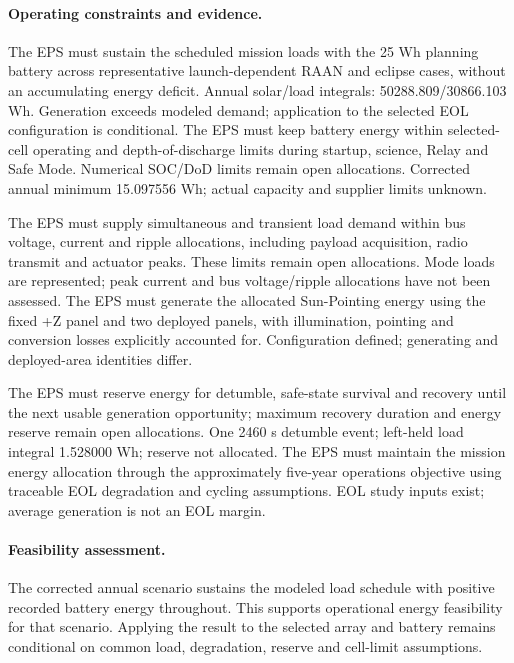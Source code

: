 \paragraph{Operating constraints and evidence.} 
The EPS must sustain the scheduled mission loads with the 25 Wh planning battery across representative launch-dependent RAAN and eclipse cases, without an accumulating energy deficit. Annual solar/load integrals: 50288.809/30866.103 Wh. Generation exceeds modeled demand; application to the selected EOL configuration is conditional.
The EPS must keep battery energy within selected-cell operating and depth-of-discharge limits during startup, science, Relay and Safe Mode. Numerical SOC/DoD limits remain open allocations. Corrected annual minimum 15.097556 Wh; actual capacity and supplier limits unknown.

The EPS must supply simultaneous and transient load demand within bus voltage, current and ripple allocations, including payload acquisition, radio transmit and actuator peaks. These limits remain open allocations. Mode loads are represented; peak current and bus voltage/ripple allocations have not been assessed.
The EPS must generate the allocated Sun-Pointing energy using the fixed +Z panel and two deployed panels, with illumination, pointing and conversion losses explicitly accounted for. Configuration defined; generating and deployed-area identities differ.

The EPS must reserve energy for detumble, safe-state survival and recovery until the next usable generation opportunity; maximum recovery duration and energy reserve remain open allocations. One 2460 s detumble event; left-held load integral 1.528000 Wh; reserve not allocated.
The EPS must maintain the mission energy allocation through the approximately five-year operations objective using traceable EOL degradation and cycling assumptions. EOL study inputs exist; average generation is not an EOL margin.

\paragraph{Feasibility assessment.} The corrected annual scenario sustains the modeled load schedule with positive recorded battery energy throughout. This supports operational energy feasibility for that scenario. Applying the result to the selected array and battery remains conditional on common load, degradation, reserve and cell-limit assumptions.

